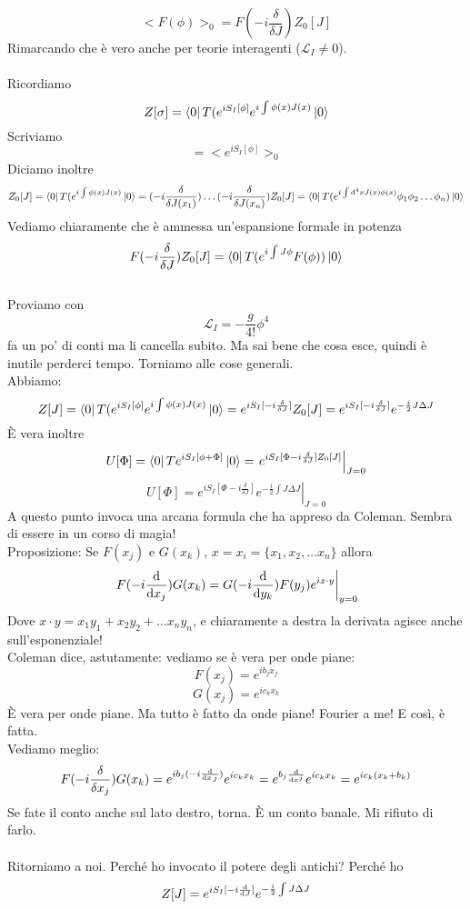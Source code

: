\documentclass[a4paper, 11pt]{article}
\begin{document}
	\[<F(\phi)>_0 = F(-i\frac{\delta}{\delta J})Z_0[J]\]
	Rimarcando che è vero anche per teorie interagenti ($\mathcal{L}_I \neq 0$).\\
	\\
	Ricordiamo
	\[Z[\sigma] = \left\langle 0\right|T(e^{iS_I[\phi]}e^{i\int{\phi(x)J(x)}}\left| 0\right\rangle\]
	Scriviamo
	\[= <e^{iS_I[\phi]}>_0\]
	Diciamo inoltre
	\[Z_0[J] = \left\langle 0\right|T(e^{i\int{\phi(x)J(x)}}\left| 0\right\rangle = (-i\frac{\delta}{\delta J(x_1)}) \dots (-i\frac{\delta}{\delta J(x_n)}) Z_0[J] = \left\langle 0\right|T(e^{i\int \mathrm{d}^4 x J(x)\phi(x)} \phi_1 \phi_2 \dots \phi_n)\left| 0\right\rangle\]
	Vediamo chiaramente che è ammessa un'espansione formale in potenza
	\[F(-i\frac{\delta}{\delta J})Z_0[J] = \left\langle 0\right|T(e^{i\int J\phi} F(\phi))\left| 0\right\rangle\]
	\\
	\noindent Proviamo con
	\[\mathcal{L}_I = -\frac{g}{4!} \phi^4\]
	fa un po' di conti ma li cancella subito. Ma sai bene che cosa esce, quindi è inutile perderci tempo. Torniamo alle cose generali.\\
	Abbiamo:
	\[Z[J] = \left\langle 0\right|T(e^{iS_I[\phi]}e^{i\int{\phi(x)J(x)}}\left| 0\right\rangle = e^{iS_I[-i\frac{\delta}{\delta J}]} Z_0[J] = e^{iS_I[-i\frac{\delta}{\delta J}]} e^{-\frac{i}{2}J\Delta J}\]
	È vera inoltre
	\[U[\Phi]=\left\langle 0\right|Te^{i S_I [\phi+\Phi]}\left| 0\right\rangle = \left. e^{iS_I[\Phi - i\frac{\delta}{\delta J}]Z_0[J]} \right|_{J=0}\]
	\[U[\Phi]= \left. e^{iS_I[\Phi-i\frac{\delta}{\delta J}]} e^{-\frac{i}{2}\int J\Delta J} \right|_{J=0}\]
	A questo punto invoca una arcana formula che ha appreso da Coleman. Sembra di essere in un corso di magia!\\
	Proposizione: Se $F(x_j)$ e $G(x_k)$, $x = x_i = \{x_1,x_2,\dots x_n\}$ allora
	\[\left. F(-i\frac{\mathrm{d}}{\mathrm{d} x_j})G(x_k) = G(-i\frac{\mathrm{d}}{\mathrm{d} y_k}) F(y_j) e^{ix\cdot y} \right|_{y=0}\]
	Dove $x\cdot y = x_1 y_1 + x_2 y_2 + \dots x_n y_n$, e chiaramente a destra la derivata agisce anche sull'esponenziale!\\
	Coleman dice, astutamente: vediamo se è vera per onde piane:
	\[F(x_j)=e^{ib_j x_j}\]
	\[G(x_j)=e^{ic_k x_k}\]
	È vera per onde piane. Ma tutto è fatto da onde piane! Fourier a me! E così, è fatta.\\
	Vediamo meglio:
	\[F(-i\frac{\delta}{\delta x_j})G(x_k) = e^{ib_j (-i\frac{\mathrm{d}}{\mathrm{d} x_J})} e^{ic_k x_k} = e^{b_j \frac{\mathrm{d}}{\mathrm{d} x^j}} e^{ic_k x_k} = e^{ic_k (x_k + b_k)}\]
	Se fate il conto anche sul lato destro, torna. È un conto banale. Mi rifiuto di farlo.\\
	\\
	\noindent Ritorniamo a noi. Perché ho invocato il potere degli antichi? Perché ho
	\[Z[J] = e^{iS_I[-i\frac{\mathrm{d}}{\mathrm{d} J}]}e^{-\frac{i}{2}\int J\Delta J}\]
\end{document}
